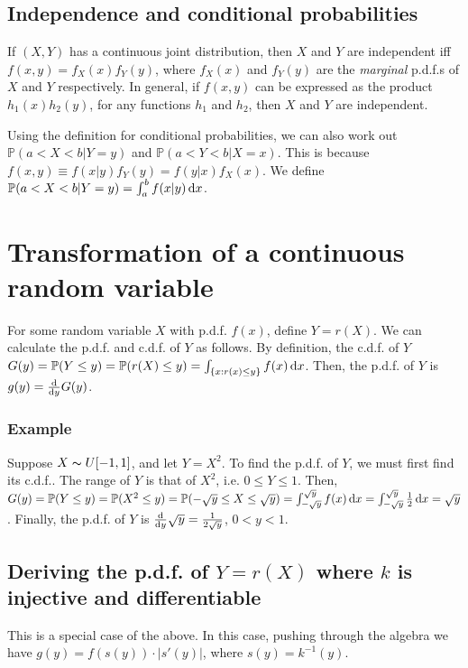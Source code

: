 \subsection{Independence and conditional probabilities}
If $(X, Y)$ has a continuous joint distribution, then $X$ and $Y$ are independent iff $f(x, y) = f_X(x)f_Y(y)$, where $f_X(x)$ and $f_Y(y)$ are the \textit{marginal} p.d.f.s of $X$ and $Y$ respectively. In general, if $f(x, y)$ can be expressed as the product $h_1(x)h_2(y)$, for any functions $h_1$ and $h_2$, then $X$ and $Y$ are independent.

Using the definition for conditional probabilities, we can also work out $\mathbb{P}(a < X < b | Y = y)$ and $\mathbb{P}(a < Y < b | X = x)$. This is because $f(x, y) \equiv f(x | y)f_Y(y) = f(y | x)f_X(x)$. We define $\mathbb{P}(a < X < b | Y = y) = \int_a^b f(x | y) \mathop{}\!\mathrm{d} x$.

\section{Transformation of a continuous random variable}
For some random variable $X$ with p.d.f. $f(x)$, define $Y = r(X)$. We can calculate the p.d.f. and c.d.f. of $Y$ as follows. By definition, the c.d.f. of $Y$ $G(y) = \mathbb{P}(Y \leq y) = \mathbb{P}(r(X) \leq y) = \int_{\left\{x: r(x) \leq y\right\}} f(x) \mathop{}\!\mathrm{d} x$. Then, the p.d.f. of $Y$ is $g(y) = \frac{\mathop{}\!\mathrm{d}}{\mathop{}\!\mathrm{d} y} G(y)$.

\subsubsection{Example}
Suppose $X \thicksim U[-1, 1]$, and let $Y = X^2$. To find the p.d.f. of $Y$, we must first find its c.d.f.. The range of $Y$ is that of $X^2$, i.e. $0 \leq Y \leq 1$. Then, $G(y) = \mathbb{P}(Y \leq y) = \mathbb{P}(X^2 \leq y) = \mathbb{P}(-\sqrt{y} \leq X \leq \sqrt{y}) = \int_{-\sqrt{y}}^{\sqrt{y}} f(x) \mathop{}\!\mathrm{d} x = \int_{-\sqrt{y}}^{\sqrt{y}} \frac{1}{2} \mathop{}\!\mathrm{d} x = \sqrt{y}$. Finally, the p.d.f. of $Y$ is $\frac{\mathop{}\!\mathrm{d}}{\mathop{}\!\mathrm{d} y} \sqrt{y} = \frac{1}{2\sqrt{y}}$, $0 < y < 1$.

\subsection{Deriving the p.d.f. of $Y = r(X)$ where $k$ is injective and differentiable}
This is a special case of the above. In this case, pushing through the algebra we have $g(y) = f(s(y)) \cdot |s'(y)|$, where $s(y) = k^{-1}(y)$.

